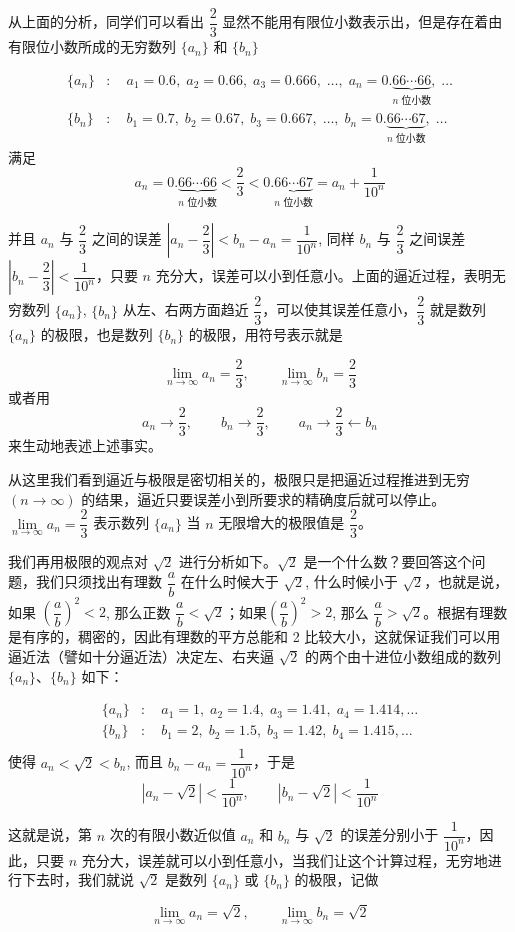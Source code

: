 {\linespread{1.6}\selectfont 从上面的分析，同学们可以看出 $\dfrac{2}{3}$ 显然不能用有限位小数表示出，但是存在着由有限位小数所成的无穷数列 $\{a_n\}$ 和 $\{b_n\}$\par}
\[\begin{split}
    \{a_n\}&:\quad a_1=0.6,\; a_2=0.66,\; a_3=0.666,\; \ldots ,\; a_n=0.\underbrace{66\cdots66}_{\text{$n$ 位小数}},\; \ldots\\
    \{b_n\}&:\quad b_1=0.7,\; b_2=0.67,\; b_3=0.667,\; \ldots ,\; b_n=0.\underbrace{66\cdots67}_{\text{$n$ 位小数}},\; \ldots
\end{split}\]
满足 
\[a_n=0.\underbrace{66\cdots66}_{\text{$n$ 位小数}}<\frac{2}{3}<0.\underbrace{66\cdots67}_{\text{$n$ 位小数}}=a_n+\frac{1}{10^n}\]
{\linespread{1.60}\selectfont 并且 $a_n$ 与 $\dfrac{2}{3}$ 之间的误差 $\left|a_n-\dfrac{2}{3}\right|<b_n-a_n=\dfrac{1}{10^n}$, 同样 $b_n$ 与 $\dfrac{2}{3}$ 之间误差 $\left|b_n-\dfrac{2}{3}\right|<\dfrac{1}{10^n}$，只要 $n$ 充分大，误差可以小到任意小。上面的逼近过程，表明无穷数列 $\{a_n\}$, $\{b_n\}$ 从左、右两方面趋近 $\dfrac{2}{3}$，可以使其误差任意小，$\dfrac{2}{3}$ 就是数列 $\{a_n\}$ 的极限，也是数列 $\{b_n\}$ 的极限，用符号表示就是\par}
\[\lim_{n\to\infty}a_n=\frac{2}{3},\qquad \lim_{n\to\infty}b_n=\frac{2}{3}\]
或者用
\[a_n\to \frac{2}{3},\qquad b_n\to\frac{2}{3},\qquad a_n\to \frac{2}{3}\leftarrow b_n\]
来生动地表述上述事实。

{\linespread{1.60}\selectfont 从这里我们看到逼近与极限是密切相关的，极限只是把逼近过程推进到无穷 $(n\to\infty)$ 的结果，逼近只要误差小到所要求的精确度后就可以停止。$\lim\limits_{n\to\infty}a_n=\dfrac{2}{3}$ 表示数列 $\{a_n\}$ 当 $n$ 无限增大的极限值是 $\dfrac{2}{3}$。\par}

{\linespread{1.65}\selectfont
我们再用极限的观点对 $\sqrt{2}$ 进行分析如下。$\sqrt{2}$ 是一个什么数？要回答这个问题，我们只须找出有理数 $\dfrac{a}{b}$ 在什么时候大于 $\sqrt{2}$, 什么时候小于 $\sqrt{2}$，也就是说，如果 $\left(\dfrac{a}{b}\right)^2<2$, 那么正数 $\dfrac{a}{b}<\sqrt{2}$；如果$\left(\dfrac{a}{b}\right)^2>2$, 那么 $\dfrac{a}{b}>\sqrt{2}$。根据有理数是有序的，稠密的，因此有理数的平方总能和 2 比较大小，这就保证我们可以用逼近法（譬如十分逼近法）决定左、右夹逼 $\sqrt{2}$ 的两个由十进位小数组成的数列 $\{a_n\}$、$\{b_n\}$ 如下：\par}
\[\begin{split}
  \{a_n\}&:\quad a_1=1,\; a_2=1.4,\; a_3=1.41,\; a_4=1.414,\ldots\\
  \{b_n\}&:\quad b_1=2,\; b_2=1.5,\; b_3=1.42,\; b_4=1.415,\ldots\\
\end{split}\]
使得 $a_n<\sqrt{2}<b_n$, 而且 $b_n-a_n=\dfrac{1}{10^n}$，于是
\[|a_n-\sqrt{2}|<\frac{1}{10^n},\qquad |b_n-\sqrt{2}|<\frac{1}{10^n} \]
{\linespread{1.6}\selectfont 这就是说，第 $n$ 次的有限小数近似值 $a_n$ 和 $b_n$ 与 $\sqrt{2}$ 的误差分别小于 $\dfrac{1}{10^n}$，因此，只要 $n$ 充分大，误差就可以小到任意小，当我们让这个计算过程，无穷地进行下去时，我们就说 $\sqrt{2}$ 是数列 $\{a_n\}$ 或 $\{b_n\}$ 的极限，记做\par}
\[\lim_{n\to\infty}a_n=\sqrt{2},\qquad \lim_{n\to\infty}b_n=\sqrt{2}\]

